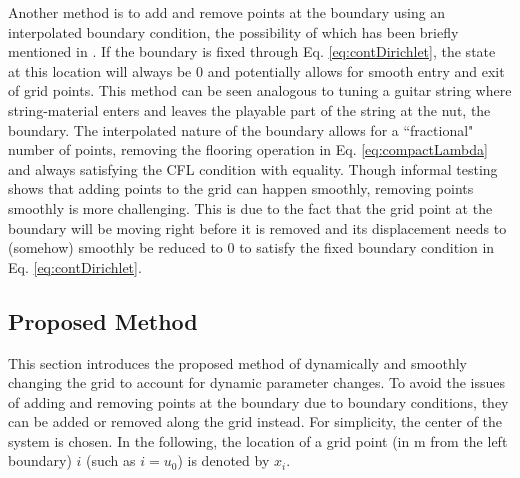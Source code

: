 \documentclass[dvipsnames, reprint]{JASA}
\def\SWcomment[#1]{\textcolor{Bittersweet}{#1}}
\begin{document}
Another method is to add and remove points at the boundary using an interpolated boundary condition, the possibility of which has been briefly mentioned in \cite[p. 145]{bilbao2009}. If the boundary is fixed through Eq. \eqref{eq:contDirichlet}, the state at this location will always be $0$ and potentially allows for smooth entry and exit of grid points. This method can be seen analogous to tuning a guitar string where string-material enters and leaves the playable part of the string at the nut, the boundary. The interpolated nature of the boundary allows for a ``fractional" number of points, removing the flooring operation in Eq. \eqref{eq:compactLambda} and always satisfying the CFL condition with equality. Though informal testing shows that adding points to the grid can happen smoothly, removing points smoothly is more challenging. This is due to the fact that the grid point at the boundary will be moving right before it is removed and its displacement needs to (somehow) smoothly be reduced to 0 to satisfy the fixed boundary condition in Eq. \eqref{eq:contDirichlet}. %

\subsection{Proposed Method}
This section introduces the proposed method of dynamically and smoothly changing the grid to account for dynamic parameter changes. To avoid the issues of adding and removing points at the boundary due to boundary conditions, they can be added or removed along the grid instead. For simplicity, the center of the system is chosen. In the following, the location of a grid point (in m from the left boundary) $i$ (such as $i = u_0$) is denoted by $x_i$. 
\end{document}
